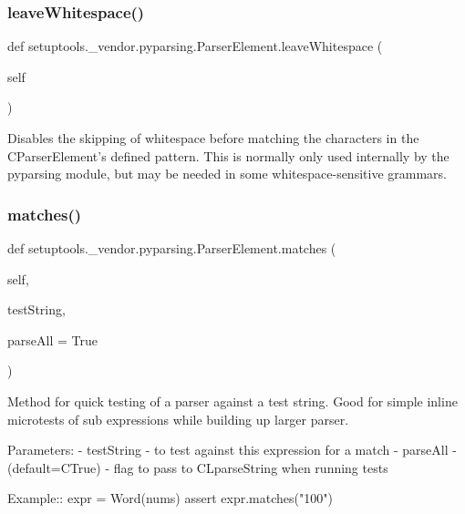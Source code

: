 \subsubsection{\texorpdfstring{leave\+Whitespace()}{leaveWhitespace()}}
{\footnotesize\ttfamily def setuptools.\+\_\+vendor.\+pyparsing.\+Parser\+Element.\+leave\+Whitespace (\begin{DoxyParamCaption}\item[{}]{self }\end{DoxyParamCaption})}

\begin{DoxyVerb}Disables the skipping of whitespace before matching the characters in the
C{ParserElement}'s defined pattern.  This is normally only used internally by
the pyparsing module, but may be needed in some whitespace-sensitive grammars.
\end{DoxyVerb}
 \mbox{\label{classsetuptools_1_1__vendor_1_1pyparsing_1_1ParserElement_a2afc43378181105cbee5ab5dd4ed776f}} 
\subsubsection{\texorpdfstring{matches()}{matches()}}
{\footnotesize\ttfamily def setuptools.\+\_\+vendor.\+pyparsing.\+Parser\+Element.\+matches (\begin{DoxyParamCaption}\item[{}]{self,  }\item[{}]{test\+String,  }\item[{}]{parse\+All = {\ttfamily True} }\end{DoxyParamCaption})}

\begin{DoxyVerb}Method for quick testing of a parser against a test string. Good for simple 
inline microtests of sub expressions while building up larger parser.
   
Parameters:
 - testString - to test against this expression for a match
 - parseAll - (default=C{True}) - flag to pass to C{L{parseString}} when running tests
    
Example::
    expr = Word(nums)
    assert expr.matches("100")
\end{DoxyVerb}
 \mbox{\label{classsetuptools_1_1__vendor_1_1pyparsing_1_1ParserElement_a9d224aee01e69b56fc10f467c860e78c}} 
